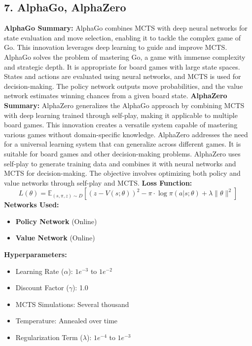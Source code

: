 \documentclass[a4paper,10pt]{article}
\begin{document}
\begin{multicols}{2}
\section*{7. AlphaGo, AlphaZero}
\textbf{AlphaGo Summary:} AlphaGo combines MCTS with deep neural networks for state evaluation and move selection, enabling it to tackle the complex game of Go. This innovation leverages deep learning to guide and improve MCTS. AlphaGo solves the problem of mastering Go, a game with immense complexity and strategic depth. It is appropriate for board games with large state spaces. States and actions are evaluated using neural networks, and MCTS is used for decision-making. The policy network outputs move probabilities, and the value network estimates winning chances from a given board state.
\textbf{AlphaZero Summary:} AlphaZero generalizes the AlphaGo approach by combining MCTS with deep learning trained through self-play, making it applicable to multiple board games. This innovation creates a versatile system capable of mastering various games without domain-specific knowledge. AlphaZero addresses the need for a universal learning system that can generalize across different games. It is suitable for board games and other decision-making problems. AlphaZero uses self-play to generate training data and combines it with neural networks and MCTS for decision-making. The objective involves optimizing both policy and value networks through self-play and MCTS.
\textbf{Loss Function:}
\[
L(\theta) = \mathbb{E}_{(s, \pi, z) \sim D} \left[ (z - V(s; \theta))^2 - \pi \cdot \log \pi(a|s; \theta) + \lambda \|\theta\|^2 \right]
\]
\textbf{Networks Used:}
\begin{itemize}
    \item \textbf{Policy Network} (Online)
    \item \textbf{Value Network} (Online)
\end{itemize}
\textbf{Hyperparameters:}
\begin{itemize}
    \item Learning Rate (\(\alpha\)): \(1e^{-3}\) to \(1e^{-2}\)
    \item Discount Factor (\(\gamma\)): 1.0
    \item MCTS Simulations: Several thousand
    \item Temperature: Annealed over time
    \item Regularization Term (\(\lambda\)): \(1e^{-4}\) to \(1e^{-3}\)
\end{itemize}

\end{multicols}
\end{document}
